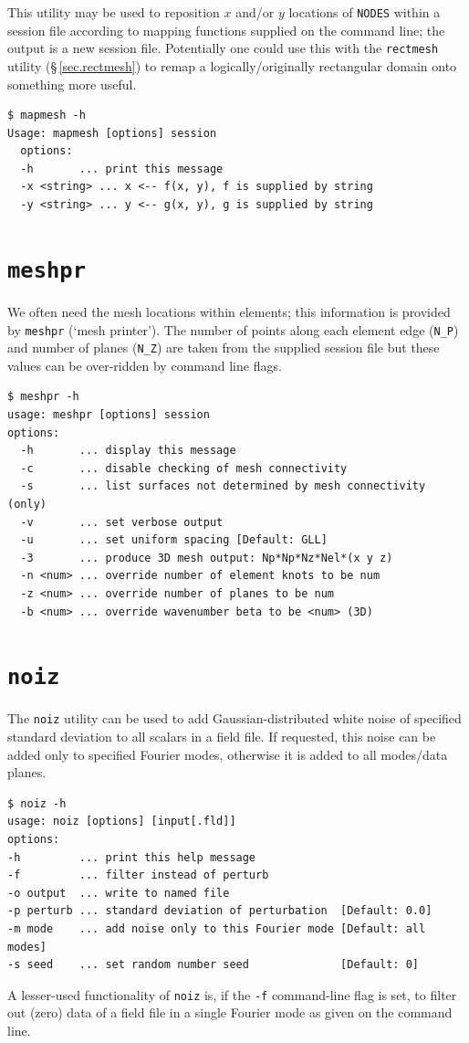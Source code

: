 \documentclass[11pt]{report}
\begin{document}
This utility may be used to reposition $x$ and/or $y$ locations of
\verb|NODES| within a session file according to mapping functions
supplied on the command line; the output is a new session file.
Potentially one could use this with the \verb|rectmesh| utility
(\S\,\ref{sec.rectmesh}) to remap a logically/originally rectangular
domain onto something more useful.
%
{\small
\begin{verbatim}
$ mapmesh -h
Usage: mapmesh [options] session
  options:
  -h       ... print this message
  -x <string> ... x <-- f(x, y), f is supplied by string
  -y <string> ... y <-- g(x, y), g is supplied by string
\end{verbatim}
}
%

\section{\texttt{meshpr}}
\label{sec.meshpr}

We often need the mesh locations within elements; this information is
provided by \verb|meshpr| (`mesh printer').  The number of points
along each element edge (\verb|N_P|) and number of planes (\verb|N_Z|)
are taken from the supplied session file but these values can be
over-ridden by command line flags.
%
{\small
\begin{verbatim}
$ meshpr -h
usage: meshpr [options] session
options:
  -h       ... display this message
  -c       ... disable checking of mesh connectivity
  -s       ... list surfaces not determined by mesh connectivity (only)
  -v       ... set verbose output
  -u       ... set uniform spacing [Default: GLL]
  -3       ... produce 3D mesh output: Np*Np*Nz*Nel*(x y z)
  -n <num> ... override number of element knots to be num
  -z <num> ... override number of planes to be num
  -b <num> ... override wavenumber beta to be <num> (3D)
\end{verbatim}
}
%

\section{\texttt{noiz}}
\label{sec.noiz}

The \verb|noiz| utility can be used to add Gaussian-distributed white
noise of specified standard deviation to all scalars in a field
file. If requested, this noise can be added only to specified Fourier
modes, otherwise it is added to all modes/data planes.
%
{\small
\begin{verbatim}
$ noiz -h
usage: noiz [options] [input[.fld]]
options:
-h         ... print this help message
-f         ... filter instead of perturb
-o output  ... write to named file
-p perturb ... standard deviation of perturbation  [Default: 0.0]
-m mode    ... add noise only to this Fourier mode [Default: all modes]
-s seed    ... set random number seed              [Default: 0]
\end{verbatim}
}
%
A lesser-used functionality of \verb|noiz| is, if the \verb|-f|
command-line flag is set, to filter out (zero) data of a field file in
a single Fourier mode as given on the command line.
\end{document}
